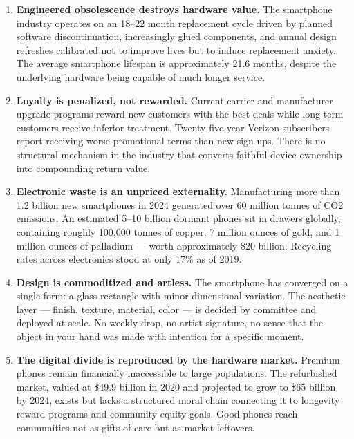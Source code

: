 \documentclass[11pt,letterpaper]{article}
\begin{document}
\begin{enumerate}
  \item \textbf{Engineered obsolescence destroys hardware value.} The smartphone industry operates on an 18--22 month replacement cycle driven by planned software discontinuation, increasingly glued components, and annual design refreshes calibrated not to improve lives but to induce replacement anxiety. The average smartphone lifespan is approximately 21.6 months, despite the underlying hardware being capable of much longer service.

  \item \textbf{Loyalty is penalized, not rewarded.} Current carrier and manufacturer upgrade programs reward new customers with the best deals while long-term customers receive inferior treatment. Twenty-five-year Verizon subscribers report receiving worse promotional terms than new sign-ups. There is no structural mechanism in the industry that converts faithful device ownership into compounding return value.

  \item \textbf{Electronic waste is an unpriced externality.} Manufacturing more than 1.2 billion new smartphones in 2024 generated over 60 million tonnes of CO2 emissions. An estimated 5--10 billion dormant phones sit in drawers globally, containing roughly 100,000 tonnes of copper, 7 million ounces of gold, and 1 million ounces of palladium --- worth approximately \$20 billion. Recycling rates across electronics stood at only 17\% as of 2019.

  \item \textbf{Design is commoditized and artless.} The smartphone has converged on a single form: a glass rectangle with minor dimensional variation. The aesthetic layer --- finish, texture, material, color --- is decided by committee and deployed at scale. No weekly drop, no artist signature, no sense that the object in your hand was made with intention for a specific moment.

  \item \textbf{The digital divide is reproduced by the hardware market.} Premium phones remain financially inaccessible to large populations. The refurbished market, valued at \$49.9 billion in 2020 and projected to grow to \$65 billion by 2024, exists but lacks a structured moral chain connecting it to longevity reward programs and community equity goals. Good phones reach communities not as gifts of care but as market leftovers.
\end{enumerate}
\end{document}
